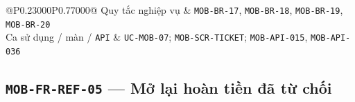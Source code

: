 \begin{longtable}{@{}P{0.23000\SRSWidth}P{0.77000\SRSWidth}@{}}
Quy tắc nghiệp vụ & \texttt{MOB-\allowbreak{}BR-\allowbreak{}17}, \texttt{MOB-\allowbreak{}BR-\allowbreak{}18}, \texttt{MOB-\allowbreak{}BR-\allowbreak{}19}, \texttt{MOB-\allowbreak{}BR-\allowbreak{}20} \\[3pt]
Ca sử dụng /\allowbreak{} màn /\allowbreak{} \texttt{API} & \texttt{UC-\allowbreak{}MOB-\allowbreak{}07}; \texttt{MOB-\allowbreak{}SCR-\allowbreak{}TICKET}; \texttt{MOB-\allowbreak{}API-\allowbreak{}015}, \texttt{MOB-\allowbreak{}API-\allowbreak{}036} \\[3pt]
\end{longtable}
\endgroup

\subsection{\texttt{MOB-\allowbreak{}FR-\allowbreak{}REF-\allowbreak{}05} — Mở lại hoàn tiền đã từ chối}
\begingroup
\fontsize{9.5}{12}\selectfont
\setlength{\SRSWidth}{\dimexpr\linewidth-2\tabcolsep\relax}
